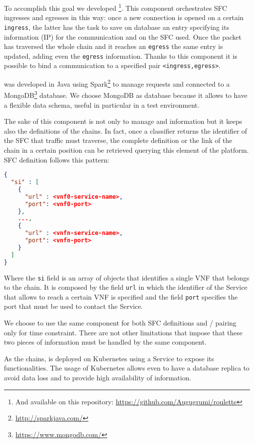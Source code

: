 \noindent
To accomplish this goal we developed \roulette{}\footnote{And available on
this repository: \url{https://github.com/Augugrumi/roulette}}. This component
orchestrates SFC ingresses and egresses in this way: once a new connection is
opened on a certain \texttt{ingress}, the latter has the task to save on 
\roulette{} database an entry specifying its information (IP) for the
communication and on the SFC used. Once the packet has traversed the whole chain
and it reaches an \texttt{egress} the same entry is updated, adding even the 
\texttt{egress} information. Thanks to this component it is possible to bind a
communication to a specified pair \verb!<ingress,egress>!.

\roulette{} was developed in Java using
Spark\footnote{\url{http://sparkjava.com/}} to manage requests and
connected to a MongoDB\footnote{\url{https://www.mongodb.com/}} database. We
choose MongoDB as database because it allows to have a flexible data schema,
useful in particular in a test environment.

The sake of this component is not only to manage \ingresses{} and \egresses{}
information but it keeps also the definitions of the chains. In fact, once a
classifier returns the identifier of the SFC that traffic must traverse, the
complete definition or the link of the chain in a certain position can be
retrieved querying this element of the platform. SFC definition follows this
pattern:

\begin{lstlisting}[caption={Definition of an SFC on \roulette{}.}, captionpos=b,
                   language=json]
{
  "si" : [
    {
      "url" : <vnf0-service-name>,
      "port": <vnf0-port>
    },
    ...,
    {
      "url" : <vnfn-service-name>,
      "port": <vnfn-port>
    }
  ]
}
\end{lstlisting}

\noindent
Where the \texttt{si} field is an array of objects that identifies a single VNF
that belongs to the chain. It is composed by the field \texttt{url} in which the
identifier of the Service that allows to reach a certain VNF is specified and
the field \texttt{port} specifies the port that must be used to contact the
Service.

We choose to use the same component for both SFC definitions and 
\ingress{}/\egresses{} pairing only for time constraint. There are not other
limitations that impose that these two pieces of information must be handled by
the same component. 

As the chains, \roulette{} is deployed on Kubernetes using a Service to expose
its functionalities. The usage of Kubernetes allows even to have a database
replica to avoid data loss and to provide high availability of information.

